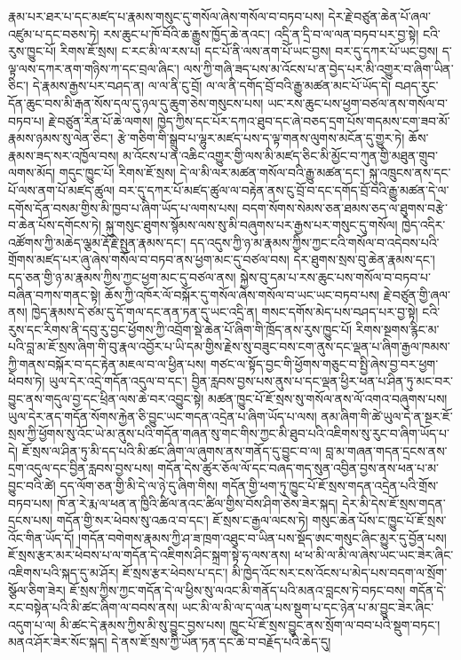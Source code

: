\documentclass{article}
\begin{document}
རྣམ་པར་ཐར་པ་དང་མཛད་པ་རྣམས་གསུང་དུ་གསོལ་ཞེས་གསོལ་བ་བཏབ་པས། དེར་རྗེ་བཙུན་ཆེན་པོ་ཞལ་འཛུམ་པ་དང་བཅས་ཏེ། རས་ཆུང་པ་ཁོ་བོའི་ཆ་རྒྱུས་ཁྱོད་ཆེ་ནའང་། འདྲི་ན་དྲི་བ་ལ་ལན་བཏབ་པར་བྱ་སྟེ། ངའི་རུས་ཁྱུང་པོ། རིགས་ཇོ་སྲས། ང་རང་མི་ལ་རས་པ། དང་པོ་ནི་ལས་ནག་པོ་ཡང་བྱས། བར་དུ་དཀར་པོ་ཡང་བྱས། ད་ལྟ་ལས་དཀར་ནག་གཉིས་ཀ་དང་བྲལ་ཞིང་། ལས་ཀྱི་གཞི་ཟད་པས་མ་འོངས་པ་ན་བྱེད་པར་མི་འགྱུར་བ་ཞིག་ཡིན་ཅིང་། དེ་རྣམས་རྒྱས་པར་བཤད་ན། ལ་ལ་ནི་ངུ་བྲོ། ལ་ལ་ནི་དགོད་བྲོ་བའི་རྒྱུ་མཚན་མང་པོ་ཡོད་དེ། བཤད་རུང་དོན་ཆུང་བས་མི་རྒན་སོས་དལ་དུ་ཉལ་དུ་ཆུག་ཅེས་གསུངས་པས། ཡང་རས་ཆུང་པས་ཕྱག་བཙལ་ནས་གསོལ་བ་བཏབ་པ། རྗེ་བཙུན་རིན་པོ་ཆེ་ལགས། ཁྱེད་ཀྱིས་དང་པོར་དཀའ་ཐུབ་དང་ཞེ་བཅད་དྲག་པོས་གདམས་ངག་ཟབ་མོ་རྣམས་ཉམས་སུ་ལེན་ཅིང་། རྩེ་གཅིག་གི་སྒྲུབ་པ་ལྷུར་མཛད་པས་ད་ལྟ་གནས་ལུགས་མངོན་དུ་གྱུར་ཏེ། ཆོས་རྣམས་ཟད་སར་འཁྱོལ་བས། མ་འོངས་པ་ན་འཆིང་འགྱུར་གྱི་ལས་མི་མཛད་ཅིང་མི་མྱོང་བ་ཀུན་གྱི་མཐུན་གྲུབ་ལགས་མོད། གདུང་ཁྱུང་པོ། རིགས་ཇོ་སྲས། དེ་ལ་མི་ལར་མཚན་གསོལ་བའི་རྒྱུ་མཚན་དང་། སྐུ་འཁྲུངས་ནས་དང་པོ་ལས་ནག་པོ་མཛད་ཚུལ། བར་དུ་དཀར་པོ་མཛད་ཚུལ་ལ་བརྟེན་ནས་ངུ་བྲོ་བ་དང་དགོད་བྲོ་བའི་རྒྱུ་མཚན་དེ་ལ་དགོས་དོན་བསམ་གྱིས་མི་ཁྱབ་པ་ཞིག་ཡོད་པ་ལགས་པས། བདག་སོགས་སེམས་ཅན་ཐམས་ཅད་ལ་ཐུགས་བརྩེ་བ་ཆེན་པོས་དགོངས་ཏེ། སྐུ་གསུང་ཐུགས་སྙོམས་ལས་སུ་མི་བཞུགས་པར་རྒྱས་པར་གསུང་དུ་གསོལ། ཁྱེད་འདིར་འཚོགས་ཀྱི་མཆེད་ལྕམ་རྡོ་རྗེ་སྤུན་རྣམས་དང་། དད་འདུས་ཀྱི་ཉ་མ་རྣམས་ཀྱིས་ཀྱང་ངའི་གསོལ་བ་འདེབས་པའི་གྲོགས་མཛད་པར་ཞུ་ཞེས་གསོལ་བ་བཏབ་ནས་ཕྱག་མང་དུ་བཙལ་བས། དེར་ཐུགས་སྲས་བུ་ཆེན་རྣམས་དང་། དད་ཅན་གྱི་ཉ་མ་རྣམས་ཀྱིས་ཀྱང་ཕྱག་མང་དུ་བཙལ་ནས། སྐྱེས་བུ་དམ་པ་རས་ཆུང་པས་གསོལ་བ་བཏབ་པ་བཞིན་བཀས་གནང་སྟེ། ཆོས་ཀྱི་འཁོར་ལོ་བསྐོར་དུ་གསོལ་ཞེས་གསོལ་བ་ཡང་ཡང་བཏབ་པས། རྗེ་བཙུན་གྱི་ཞལ་ནས། ཁྱེད་རྣམས་དེ་ཙམ་དུ་དོ་གལ་དང་ནན་ཏན་དུ་ཡང་འདྲི་ན། གསང་དགོས་མེད་པས་བཤད་པར་བྱ་སྟེ། ངའི་རུས་དང་རིགས་ནི་དབུ་རུ་བྱང་ཕྱོགས་ཀྱི་འབྲོག་སྡེ་ཆེན་པོ་ཞིག་གི་ཁྲོད་ནས་རུས་ཁྱུང་པོ། རིགས་སྔགས་རྙིང་མ་པའི་བླ་མ་ཇོ་སྲས་ཞིག་གི་བུ་རྣལ་འབྱོར་པ་ཡི་དམ་གྱིས་རྗེས་སུ་བཟུང་བས་ངག་ནུས་དང་ལྡན་པ་ཞིག་རྒྱལ་ཁམས་ཀྱི་གནས་བསྐོར་བ་དང་རྟེན་མཇལ་བ་ལ་ཕྱིན་པས། གཙང་ལ་སྟོད་བྱང་གི་ཕྱོགས་གཅུང་བ་སྤྱི་ཞེས་བྱ་བར་ཕྱག་ཕེབས་ཏེ། ཡུལ་དེར་འདྲེ་གདོན་འདུལ་བ་དང་། བྱིན་རླབས་བྱས་པས་ནུས་པ་དང་ལྡན་ཕྱིར་ཕན་པ་ཤིན་ཏུ་མང་བར་བྱུང་ནས་གདུལ་བྱ་དང་ཕྲིན་ལས་ཆེ་བར་འབྱུང་སྟེ། མཚན་ཁྱུང་པོ་ཇོ་སྲས་སུ་གསོལ་ནས་ལོ་འགའ་བཞུགས་པས། ཡུལ་དེར་ནད་གདོན་སོགས་རྐྱེན་ཅི་བྱུང་ཡང་གདན་འདྲེན་པ་ཞིག་ཡོད་པ་ལས། ནམ་ཞིག་གི་ཚེ་ཡུལ་དེ་ན་སྔར་ཇོ་སྲས་ཀྱི་ཕྱོགས་སུ་འོང་ཡེ་མ་ནུས་པའི་གདོན་གཞན་སུ་གང་གིས་ཀྱང་མི་ཐུབ་པའི་འཇིགས་སུ་རུང་བ་ཞིག་ཡོད་པ་དེ། ཇོ་སྲས་ལ་ཤིན་ཏུ་མི་དད་པའི་མི་ཚང་ཞིག་ལ་ཞུགས་ནས་གནོད་དུ་བྱུང་བ་ལ། བླ་མ་གཞན་གདན་དྲངས་ནས་དྲག་འདུལ་དང་བྱིན་རླབས་བྱས་པས། གདོན་དེས་ཚུར་ཅོལ་ལོ་དང་བཞད་གད་སུན་འབྱིན་བྱས་ནས་ཕན་པ་མ་བྱུང་བའི་ཚེ། དད་ལོག་ཅན་གྱི་མི་དེ་ལ་ཉེ་དུ་ཞིག་གིས། གདོན་གྱི་ཕག་ཏུ་ཁྱུང་པོ་ཇོ་སྲས་གདན་འདྲེན་པའི་གྲོས་བཏབ་པས། ཁོ་ན་རེ་རྨ་ལ་ཕན་ན་ཁྱིའི་ཚིལ་ནའང་ཚིལ་གྱིས་བོས་ཤིག་ཅེས་ཟེར་སྐད། དེར་མི་དེས་ཇོ་སྲས་གདན་དྲངས་པས། གདོན་གྱི་སར་ཕེབས་སུ་འཆའ་བ་དང་། ཇོ་སྲས་ང་རྒྱལ་ལངས་ཏེ། གསུང་ཆེན་པོས་ང་ཁྱུང་པོ་ཇོ་སྲས་འོང་གིན་ཡོད་དོ། །གདོན་བགེགས་རྣམས་ཀྱི་ཤ་ཟ་ཁྲག་འཐུང་བ་ཡིན་པས་སྡོད་ཨང་གསུང་ཞིང་མྱུར་དུ་བྱོན་པས། ཇོ་སྲས་རྩར་མར་ཕེབས་པ་ལ་གདོན་དེ་འཇིགས་ཤིང་སྐྲག་སྟེ་ཧ་ལས་ནས། ཕ་ཕ་མི་ལ་མི་ལ་ཞེས་ཡང་ཡང་ཟེར་ཞིང་འཇིགས་པའི་སྐད་དུ་མ་ཤོར། ཇོ་སྲས་རྩར་ཕེབས་པ་དང་། མི་ཁྱེད་འོང་སར་ངས་འོངས་པ་མེད་པས་བདག་ལ་སྲོག་སྩོལ་ཅིག་ཟེར། ཇོ་སྲས་ཀྱིས་ཀྱང་གདོན་དེ་ལ་ཕྱིས་སུ་ལའང་མི་གནོད་པའི་མནའ་བླངས་ཏེ་བཏང་བས། གདོན་དེ་རང་བསྟེན་པའི་མི་ཚང་ཞིག་ལ་བབས་ནས། ཡང་མི་ལ་མི་ལ་ད་ལན་པས་སྡུག་པ་དང་ཉེན་པ་མ་བྱུང་ཟེར་ཞིང་འདུག་པ་ལ། མི་ཚང་དེ་རྣམས་ཀྱིས་མི་སུ་བྱུང་བྱས་པས། ཁྱུང་པོ་ཇོ་སྲས་བྱུང་ནས་སྲོག་ལ་བབ་པའི་སྡུག་བཏང་། མནའ་ཤོར་ཟེར་སོང་སྐད། དེ་ནས་ཇོ་སྲས་ཀྱི་ཡོན་ཏན་དང་ཆེ་བ་བརྗོད་པའི་ཆེད་དུ། 
\end{document}

